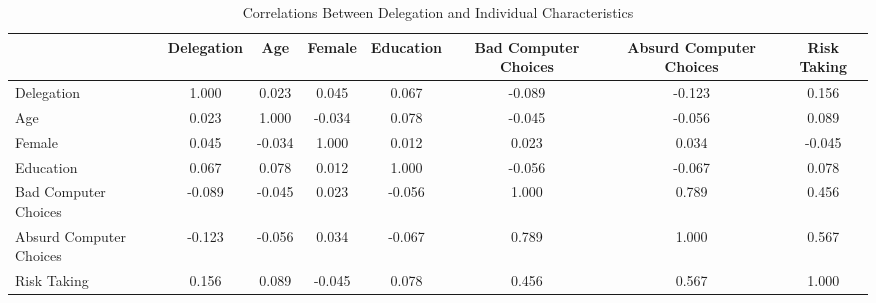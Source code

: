 \begin{table}[htbp]
\centering
\caption{Correlations Between Delegation and Individual Characteristics}
\begin{tabular}{lccccccc}
\toprule
 & Delegation & Age & Female & Education & Bad Computer Choices & Absurd Computer Choices & Risk Taking \\
\midrule
Delegation & 1.000 & 0.023 & 0.045 & 0.067 & -0.089 & -0.123 & 0.156 \\
Age & 0.023 & 1.000 & -0.034 & 0.078 & -0.045 & -0.056 & 0.089 \\
Female & 0.045 & -0.034 & 1.000 & 0.012 & 0.023 & 0.034 & -0.045 \\
Education & 0.067 & 0.078 & 0.012 & 1.000 & -0.056 & -0.067 & 0.078 \\
Bad Computer Choices & -0.089 & -0.045 & 0.023 & -0.056 & 1.000 & 0.789 & 0.456 \\
Absurd Computer Choices & -0.123 & -0.056 & 0.034 & -0.067 & 0.789 & 1.000 & 0.567 \\
Risk Taking & 0.156 & 0.089 & -0.045 & 0.078 & 0.456 & 0.567 & 1.000 \\
\bottomrule
\end{tabular}
\label{tab:correlations}
\end{table}
